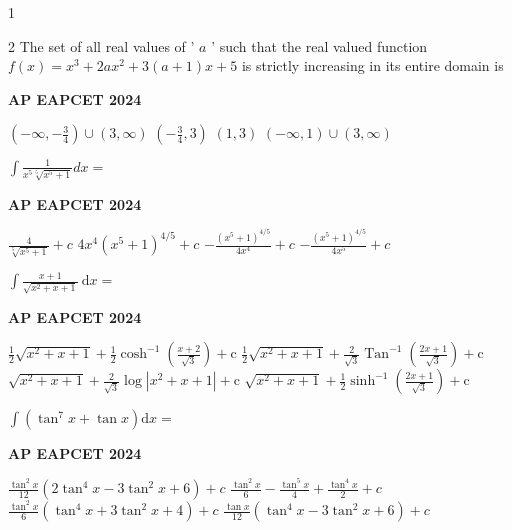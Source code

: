 \documentclass[11pt,paper=a4,answers]{exam}
\begin{document}
\begin{multicols}{2}
\begin{questions}
1

2
\question
The set of all real values of ' $a$ ' such that the real valued function $f(x)=x^3+2 a x^2+3(a+1) x+5$ is strictly increasing in its entire domain is
\begin{flushright}
\small\textbf{AP EAPCET 2024}
\end{flushright}
\begin{choices}
  \choice $\left(-\infty,-\frac{3}{4}\right) \cup(3, \infty)$
  \choice $\left(-\frac{3}{4}, 3\right)$ 
  \choice $(1,3)$
  \choice $(-\infty, 1) \cup(3, \infty)$
\end{choices}

\question
$\int \frac{1}{x^5 \sqrt[5]{x^5+1}} d x=$
\begin{flushright}
\small\textbf{AP EAPCET 2024}
\end{flushright}
\begin{choices}
  \choice $\frac{4}{\sqrt[5]{x^5+1}}+c$
  \choice $4 x^4\left(x^5+1\right)^{4 / 5}+c $ 
  \choice $ -\frac{\left(x^5+1\right)^{4 / 5}}{4 x^4}+c$ 
  \choice $-\frac{\left(x^5+1\right)^{4 / 5}}{4 x^5}+c$
\end{choices}


\question
$\int \frac{x+1}{\sqrt{x^2+x+1}} \mathrm{~d} x=$
\begin{flushright}
\small\textbf{AP EAPCET 2024}
\end{flushright}
\begin{choices}
  \choice $\frac{1}{2} \sqrt{x^2+x+1}+\frac{1}{2} \cosh ^{-1}\left(\frac{x+2}{\sqrt{3}}\right)+\mathrm{c}$
  \choice $\frac{1}{2} \sqrt{x^2+x+1}+\frac{2}{\sqrt{3}} \operatorname{Tan}^{-1}\left(\frac{2 x+1}{\sqrt{3}}\right)+\mathrm{c}$ 
  \choice $\sqrt{x^2+x+1}+\frac{2}{\sqrt{3}} \log \left|x^2+x+1\right|+\mathrm{c}$ 
  \choice $\sqrt{x^2+x+1}+\frac{1}{2} \sinh ^{-1}\left(\frac{2 x+1}{\sqrt{3}}\right)+\mathrm{c}$
\end{choices}



\question
$\int\left(\tan ^7 x+\tan x\right) \mathrm{d} x=$
\begin{flushright}
\small\textbf{AP EAPCET 2024}
\end{flushright}
\begin{choices}
  \choice $\frac{\tan ^2 x}{12}\left(2 \tan ^4 x-3 \tan ^2 x+6\right)+c$
  \choice $\frac{\tan ^2 x}{6}-\frac{\tan ^5 x}{4}+\frac{\tan ^4 x}{2}+c$ 
  \choice $\frac{\tan ^2 x}{6}\left(\tan ^4 x+3 \tan ^2 x+4\right)+c$ 
  \choice $\frac{\tan x}{12}\left(\tan ^4 x-3 \tan ^2 x+6\right)+c$
\end{choices}




\end{questions}
\end{multicols}
\end{document}
